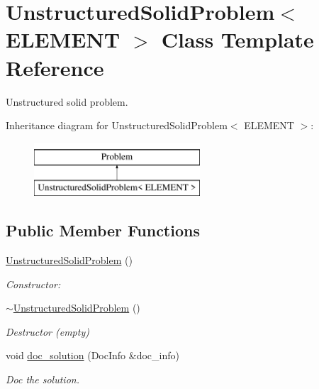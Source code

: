 \hypertarget{classUnstructuredSolidProblem}{}\section{Unstructured\+Solid\+Problem$<$ E\+L\+E\+M\+E\+NT $>$ Class Template Reference}
\label{classUnstructuredSolidProblem}


Unstructured solid problem.  


Inheritance diagram for Unstructured\+Solid\+Problem$<$ E\+L\+E\+M\+E\+NT $>$\+:\begin{figure}[H]
\begin{center}
\leavevmode
\includegraphics[height=2.000000cm]{classUnstructuredSolidProblem}
\end{center}
\end{figure}
\subsection*{Public Member Functions}
\begin{DoxyCompactItemize}
\item 
\hyperlink{classUnstructuredSolidProblem_a18ce02b6e4bbc86403c9e1b32c095772}{Unstructured\+Solid\+Problem} ()
\begin{DoxyCompactList}\small\item\em Constructor\+: \end{DoxyCompactList}\item 
\hyperlink{classUnstructuredSolidProblem_a25fe105d949498bf8f7c15aff96a7d00}{$\sim$\+Unstructured\+Solid\+Problem} ()
\begin{DoxyCompactList}\small\item\em Destructor (empty) \end{DoxyCompactList}\item 
void \hyperlink{classUnstructuredSolidProblem_ab3d66fd61b69d12b4f159d763fc44f15}{doc\+\_\+solution} (Doc\+Info \&doc\+\_\+info)
\begin{DoxyCompactList}\small\item\em Doc the solution. \end{DoxyCompactList}\end{DoxyCompactItemize}
